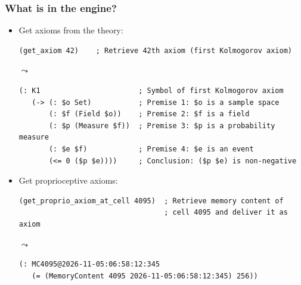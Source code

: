 \documentclass[aspectratio=169]{beamer}
\begin{document}
\begin{frame}
\end{frame}

\begin{frame}[fragile]
  \frametitle{What is in the engine?}
  \begin{itemize}
  \item<+-> Get axioms from the theory:
  \begin{verbatim}
(get_axiom 42)    ; Retrieve 42th axiom (first Kolmogorov axiom)
  \end{verbatim}
$\leadsto$
  \begin{verbatim}
(: K1                       ; Symbol of first Kolmogorov axiom
   (-> (: $o Set)           ; Premise 1: $o is a sample space
       (: $f (Field $o))    ; Premise 2: $f is a field
       (: $p (Measure $f))  ; Premise 3: $p is a probability measure
       (: $e $f)            ; Premise 4: $e is an event
       (<= 0 ($p $e))))     ; Conclusion: ($p $e) is non-negative
     \end{verbatim}
  \item<+-> Get proprioceptive axioms:
  \begin{verbatim}
(get_proprio_axiom_at_cell 4095)  ; Retrieve memory content of
                                  ; cell 4095 and deliver it as axiom
  \end{verbatim}
$\leadsto$
  \begin{verbatim}
(: MC4095@2026-11-05:06:58:12:345
   (= (MemoryContent 4095 2026-11-05:06:58:12:345) 256))
  \end{verbatim}
  \end{itemize}
\end{frame}
\end{document}
